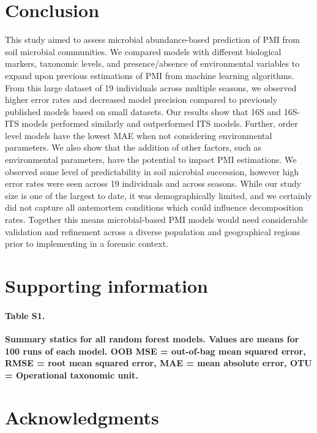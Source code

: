 \documentclass[
  10pt,
  letterpaper,
]{article}
\begin{document}
\hypertarget{conclusion}{%
\section{Conclusion}\label{conclusion}}

This study aimed to assess microbial abundance-based prediction of PMI
from soil microbial communities. We compared models with different
biological markers, taxonomic levels, and presence/absence of
environmental variables to expand upon previous estimations of PMI from
machine learning algorithms. From this large dataset of 19 individuals
across multiple seasons, we observed higher error rates and decreased
model precision compared to previously published models based on small
datasets. Our results show that 16S and 16S-ITS models performed
similarly and outperformed ITS models. Further, order level models have
the lowest MAE when not considering environmental parameters. We also
show that the addition of other factors, such as environmental
parameters, have the potential to impact PMI estimations. We observed
some level of predictability in soil microbial succession, however high
error rates were seen across 19 individuals and across seasons. While
our study size is one of the largest to date, it was demographically
limited, and we certainly did not capture all antemortem conditions
which could influence decomposition rates. Together this means
microbial-based PMI models would need considerable validation and
refinement across a diverse population and geographical regions prior to
implementing in a forensic context.

\hypertarget{supporting-information}{%
\section{Supporting information}\label{supporting-information}}

\paragraph*{Table S1.}
\label{s1-table}
{\textbf{Summary statics for all random forest models. Values are means
for 100 runs of each model. OOB MSE = out-of-bag mean squared error,
RMSE = root mean squared error, MAE = mean absolute error, OTU =
Operational taxonomic unit.}}

\hypertarget{acknowledgments}{%
\section{Acknowledgments}\label{acknowledgments}}
\end{document}
